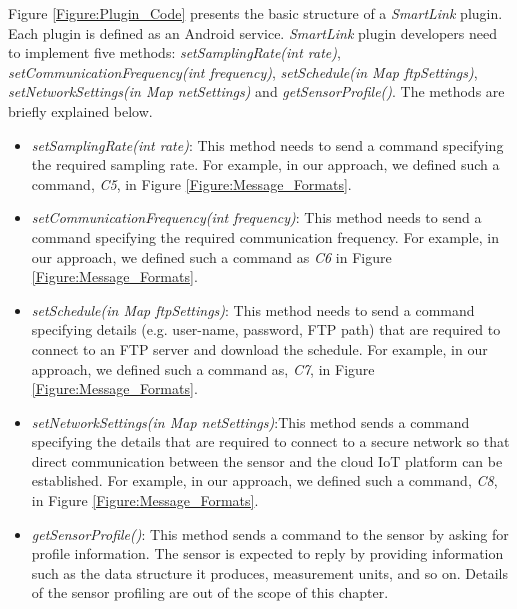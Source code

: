 \documentclass[graybox]{svmult}
\begin{document}
Figure \ref{Figure:Plugin_Code} presents the basic structure of a \textit{SmartLink} plugin. Each plugin is defined as an Android service. \textit{SmartLink} plugin developers need to implement five methods: \textit{setSamplingRate(int  rate)}, \textit{setCommunicationFrequency(int  frequency)}, \textit{setSchedule(in Map ftpSettings)}, \textit{setNetworkSettings(in Map netSettings)} and \textit{getSensorProfile()}. The methods are briefly explained below.






\begin{itemize}
\item \textit{setSamplingRate(int rate)}:  This method needs to send a command specifying the required sampling rate. For example, in our approach, we defined such a command, \textit{C5}, in Figure \ref{Figure:Message_Formats}.


\item \textit{setCommunicationFrequency(int frequency)}: This method needs to send a command specifying the required communication frequency. For example, in our approach, we defined such a command as \textit{C6} in Figure  \ref{Figure:Message_Formats}.

\item \textit{setSchedule(in Map ftpSettings)}: This method needs to send a command  specifying details (e.g. user-name, password, FTP path) that are required to connect to an FTP server and download  the schedule. For example, in our approach, we defined such a command as, \textit{C7}, in Figure \ref{Figure:Message_Formats}.

\item \textit{setNetworkSettings(in Map netSettings)}:This method sends a command  specifying the details that are required to connect to a secure network  so that direct  communication  between the sensor and the cloud IoT platform  can be established. For example, in our approach, we defined such a command, \textit{C8}, in Figure \ref{Figure:Message_Formats}.

\item \textit{getSensorProfile()}: This method sends a command  to the sensor by asking for profile information.  The sensor is expected to reply by providing  information  such as the data structure it produces, measurement units, and so on. Details of the sensor profiling are out of the scope of this chapter.



\end{itemize}
\end{document}
